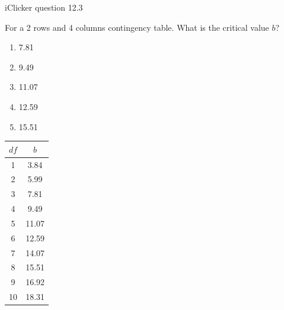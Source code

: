 \documentclass[14pt]{beamer}\usepackage[]{graphicx}\usepackage[]{color}
\begin{document}
\begin{frame}[fragile]{iClicker question 12.3}

\begin{minipage}[ht]{8cm}

For a 2 rows and 4 columns contingency table. What is the critical value $b$?

\begin{enumerate}
\item 7.81
\item 9.49
\item 11.07
\item 12.59
\item 15.51
\end{enumerate}

\end{minipage} \hfill
\begin{minipage}[ht]{3cm}

{\small{
\begin{tabular}{@{} cc @{}} \hline
$df$ & $b$ \\ \hline
1 & 3.84 \\
2 & 5.99 \\
3 & 7.81 \\
4 & 9.49 \\
5 & 11.07 \\
6 & 12.59 \\
7 & 14.07 \\
8 & 15.51 \\
9 & 16.92 \\
10 & 18.31 \\ \hline
\end{tabular}
}}
\end{minipage}

\end{frame}
\end{document}
